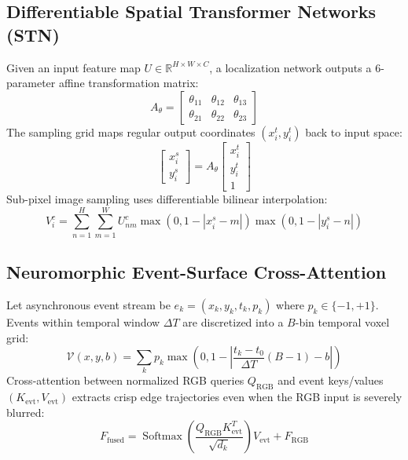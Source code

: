 \documentclass[journal,twocolumn,letterpaper]{IEEEtran}
\begin{document}
\subsection{Differentiable Spatial Transformer Networks (STN)}
Given an input feature map $U \in \mathbb{R}^{H \times W \times C}$, a localization network outputs a 6-parameter affine transformation matrix:
\begin{equation}
A_\theta = \begin{bmatrix} \theta_{11} & \theta_{12} & \theta_{13} \\ \theta_{21} & \theta_{22} & \theta_{23} \end{bmatrix}
\end{equation}
The sampling grid maps regular output coordinates $(x_i^t, y_i^t)$ back to input space:
\begin{equation}
\begin{bmatrix} x_i^s \\ y_i^s \end{bmatrix} = A_\theta \begin{bmatrix} x_i^t \\ y_i^t \\ 1 \end{bmatrix}
\end{equation}
Sub-pixel image sampling uses differentiable bilinear interpolation:
\begin{equation}
V_i^c = \sum_{n=1}^H \sum_{m=1}^W U_{nm}^c \max(0, 1 - |x_i^s - m|) \max(0, 1 - |y_i^s - n|)
\end{equation}

\subsection{Neuromorphic Event-Surface Cross-Attention}
Let asynchronous event stream be $e_k = (x_k, y_k, t_k, p_k)$ where $p_k \in \{-1, +1\}$. Events within temporal window $\Delta T$ are discretized into a $B$-bin temporal voxel grid:
\begin{equation}
\mathcal{V}(x, y, b) = \sum_{k} p_k \max\left(0, 1 - \left| \frac{t_k - t_0}{\Delta T} (B - 1) - b \right| \right)
\end{equation}
Cross-attention between normalized RGB queries $Q_{\text{RGB}}$ and event keys/values $(K_{\text{evt}}, V_{\text{evt}})$ extracts crisp edge trajectories even when the RGB input is severely blurred:
\begin{equation}
F_{\text{fused}} = \operatorname{Softmax}\left( \frac{Q_{\text{RGB}} K_{\text{evt}}^T}{\sqrt{d_k}} \right) V_{\text{evt}} + F_{\text{RGB}}
\end{equation}
\end{document}
